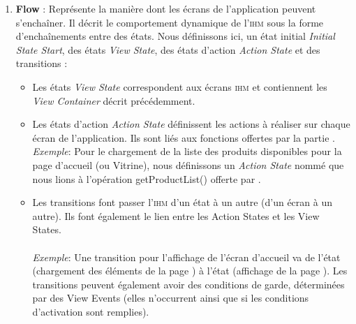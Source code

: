 \begin{enumerate}
\item \textbf{Flow} : Représente la manière dont les écrans de l'application peuvent s'enchaîner. Il décrit le comportement dynamique de l'\textsc{ihm} sous la forme d'enchaînements entre des états. Nous définissons ici, un état initial \textit{Initial State Start}, des états \textit{View State}, des états d'action \textit{Action State} et des transitions :
\begin{itemize}
\item Les états \textit{View State} correspondent aux écrans \textsc{ihm} et contiennent les \textit{View Container} décrit précédemment.
\item Les états d'action \textit{Action State} définissent les actions à réaliser sur chaque écran de l'application. Ils sont liés aux fonctions offertes par la partie \kwsoa{}. 
\textit{Exemple}: Pour le chargement de la liste des produits disponibles pour la page d'accueil (ou Vitrine), nous définissons un \textit{Action State} nommé  que nous lions à l'opération getProductList() offerte par \kwsoa{}.  
\item Les transitions  font passer l'\textsc{ihm} d'un état à un autre (d'un écran à un autre). Ils font également le lien entre les Action States et les View States. 
\paragraph{}
\textit{Exemple}: Une transition pour l'affichage de l'écran d'accueil  va de l'état  (chargement des éléments de la page ) à l'état  (affichage de la page ).
\newline
Les transitions peuvent également avoir des conditions de garde, déterminées par des View Events (elles n'occurrent ainsi que si les conditions d'activation sont remplies).
\end{itemize}
\end{enumerate}       



